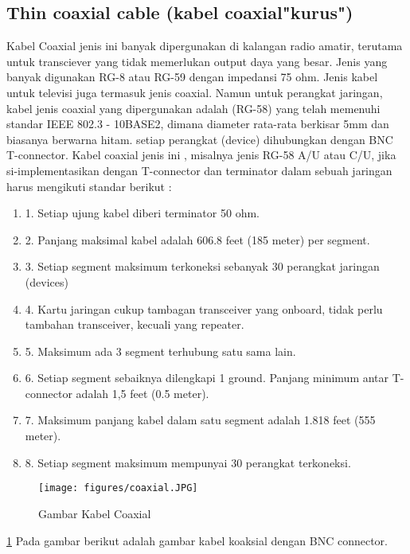 \begin{itemize}
\begin{itemize}
	\subsection{Thin coaxial cable (kabel coaxial"kurus")}
Kabel Coaxial jenis ini banyak dipergunakan di kalangan radio amatir, terutama untuk transciever yang tidak memerlukan output daya yang besar. Jenis yang banyak digunakan RG-8 atau RG-59 dengan impedansi 75 ohm. Jenis kabel untuk televisi juga termasuk jenis coaxial.
Namun untuk perangkat jaringan, kabel jenis coaxial yang dipergunakan adalah (RG-58) yang telah memenuhi standar IEEE 802.3 - 10BASE2, dimana diameter rata-rata berkisar 5mm dan biasanya berwarna hitam. setiap perangkat (device) dihubungkan dengan BNC T-connector.
Kabel coaxial jenis ini , misalnya jenis RG-58 A/U atau C/U, jika si-implementasikan dengan T-connector dan terminator dalam sebuah jaringan harus mengikuti standar berikut :
\begin{enumerate}
	\item 1. Setiap ujung kabel diberi terminator 50 ohm.
	\item 2. Panjang maksimal kabel adalah 606.8 feet (185 meter) per segment.
	\item 3. Setiap segment maksimum terkoneksi sebanyak 30 perangkat jaringan (devices)
	\item 4. Kartu jaringan cukup tambagan transceiver yang onboard, tidak perlu tambahan transceiver, kecuali yang repeater.
	\item 5. Maksimum ada 3 segment terhubung satu sama lain.
	\item 6. Setiap segment sebaiknya dilengkapi 1 ground.
	Panjang minimum antar T-connector adalah 1,5 feet (0.5 meter).
	\item 7. Maksimum panjang kabel dalam satu segment adalah 1.818 feet (555 meter).
	\item 8. Setiap segment maksimum mempunyai 30 perangkat terkoneksi.\cite{syafrizal2005pengantar}
\end{enumerate}
\begin{figure} [ht]
	\centerline{\texttt{[image: figures/coaxial.JPG]}}
	\caption{Gambar Kabel Coaxial}
	\label{coaxial}
\end{figure}
\ref{coaxial} Pada gambar berikut adalah gambar kabel koaksial dengan BNC connector.


\end{itemize}
\end{itemize}
